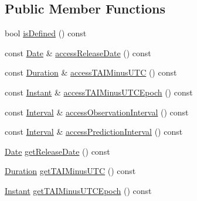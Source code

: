 \subsection*{Public Member Functions}
\begin{DoxyCompactItemize}
\item 
bool \hyperlink{classlibrary_1_1physics_1_1coord_1_1frame_1_1provider_1_1iers_1_1_bulletin_a_a7e56a92bd3c47f77f988c3f9500ffefc}{is\+Defined} () const
\item 
const \hyperlink{classlibrary_1_1physics_1_1time_1_1_date}{Date} \& \hyperlink{classlibrary_1_1physics_1_1coord_1_1frame_1_1provider_1_1iers_1_1_bulletin_a_ad41457e1328a3027e0295981aa755459}{access\+Release\+Date} () const
\item 
const \hyperlink{classlibrary_1_1physics_1_1time_1_1_duration}{Duration} \& \hyperlink{classlibrary_1_1physics_1_1coord_1_1frame_1_1provider_1_1iers_1_1_bulletin_a_a2328367e563496c0e1ae9f6f24821503}{access\+T\+A\+I\+Minus\+U\+TC} () const
\item 
const \hyperlink{classlibrary_1_1physics_1_1time_1_1_instant}{Instant} \& \hyperlink{classlibrary_1_1physics_1_1coord_1_1frame_1_1provider_1_1iers_1_1_bulletin_a_a7d6e2b9004b8850d7d0d3c0524a46a10}{access\+T\+A\+I\+Minus\+U\+T\+C\+Epoch} () const
\item 
const \hyperlink{classlibrary_1_1physics_1_1time_1_1_interval}{Interval} \& \hyperlink{classlibrary_1_1physics_1_1coord_1_1frame_1_1provider_1_1iers_1_1_bulletin_a_aa11bd395146f5fba123269de30353bcc}{access\+Observation\+Interval} () const
\item 
const \hyperlink{classlibrary_1_1physics_1_1time_1_1_interval}{Interval} \& \hyperlink{classlibrary_1_1physics_1_1coord_1_1frame_1_1provider_1_1iers_1_1_bulletin_a_ac453fc509ca657946ad41b9f88e8656d}{access\+Prediction\+Interval} () const
\item 
\hyperlink{classlibrary_1_1physics_1_1time_1_1_date}{Date} \hyperlink{classlibrary_1_1physics_1_1coord_1_1frame_1_1provider_1_1iers_1_1_bulletin_a_a8edff3ac319832dfa9db166aace216d7}{get\+Release\+Date} () const
\item 
\hyperlink{classlibrary_1_1physics_1_1time_1_1_duration}{Duration} \hyperlink{classlibrary_1_1physics_1_1coord_1_1frame_1_1provider_1_1iers_1_1_bulletin_a_a540ee167693ac43cd715dcbdd4347211}{get\+T\+A\+I\+Minus\+U\+TC} () const
\item 
\hyperlink{classlibrary_1_1physics_1_1time_1_1_instant}{Instant} \hyperlink{classlibrary_1_1physics_1_1coord_1_1frame_1_1provider_1_1iers_1_1_bulletin_a_a996dda347950138037ac2e5f5311d385}{get\+T\+A\+I\+Minus\+U\+T\+C\+Epoch} () const

\end{DoxyCompactItemize}
